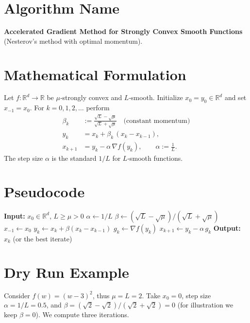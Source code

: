 \documentclass{article}
\newcommand{\grad}{\nabla}
\begin{document}
\section*{Algorithm Name}
\textbf{Accelerated Gradient Method for Strongly Convex Smooth Functions} (Nesterov’s method with optimal momentum).

\section*{Mathematical Formulation}
Let $f:\mathbb{R}^d\rightarrow\mathbb{R}$ be $\mu$‑strongly convex and $L$‑smooth.  
Initialize $x_{0}=y_{0}\in\mathbb{R}^{d}$ and set $x_{-1}=x_0$.  
For $k=0,1,2,\dots$ perform
\begin{align}
\beta_k &:= \frac{\sqrt{L}-\sqrt{\mu}}{\sqrt{L}+\sqrt{\mu}}\quad\text{(constant momentum)}\label{eq:beta}\\[4pt]
y_k &= x_k + \beta_k\,(x_k-x_{k-1}), \label{eq:y}\\[4pt]
x_{k+1} &= y_k - \alpha\,\grad f(y_k),\qquad 
\alpha := \frac{1}{L}. \label{eq:x}
\end{align}
The step size $\alpha$ is the standard $1/L$ for $L$‑smooth functions.

\section*{Pseudocode}
\begin{algorithm}[H]
\caption{Accelerated Gradient for Strongly Convex $f$}
\begin{algorithmic}[1]
\State \textbf{Input:} $x_0\in\mathbb{R}^d$, $L\ge \mu>0$
\State $\alpha \gets 1/L$
\State $\beta \gets (\sqrt{L}-\sqrt{\mu})/(\sqrt{L}+\sqrt{\mu})$
\State $x_{-1}\gets x_0$
    \State $y_k \gets x_k + \beta (x_k-x_{k-1})$ 
    \State $g_k \gets \grad f(y_k)$
    \State $x_{k+1} \gets y_k - \alpha\, g_k$ 
\EndFor
\State \textbf{Output:} $x_{k}$ (or the best iterate)
\end{algorithmic}
\end{algorithm}

\section*{Dry Run Example}
Consider $f(w)=(w-3)^2$, thus $\mu=L=2$.  
Take $x_0=0$, step size $\alpha=1/L=0.5$, and $\beta=(\sqrt{2}-\sqrt{2})/(\sqrt{2}+\sqrt{2})=0$ (for illustration we keep $\beta=0$).  
We compute three iterations.
\end{document}

